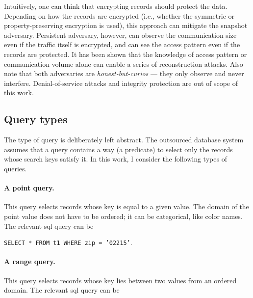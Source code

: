 			Intuitively, one can think that encrypting records should protect the data.
			Depending on how the records are encrypted (i.e., whether the symmetric or property-preserving encryption is used), this approach can mitigate the snapshot adversary.
			Persistent adversary, however, can observe the communication size even if the traffic itself is encrypted, and can see the access pattern even if the records are protected.
			It has been shown that the knowledge of access pattern \cite{multidimensional-range-queries, inference-attack-islam-14, leakage-abuse-attacks-cash-15, inference-attacks-naveed-15, generic-attacks-kellaris, attacks-tao-of-inference, grubbs-attacks, access-pattern-disclosure, attacks-improved-reconstruction} or communication volume \cite{generic-attacks-kellaris, state-of-uniform, attacks-improved-reconstruction, pump-volume-attacks, volume-range-attacks} alone can enable a series of reconstruction attacks.
			Also note that both adversaries are \emph{honest-but-curios} --- they only observe and never interfere.
			Denial-of-service attacks and integrity protection are out of scope of this work.

		\subsection{Query types}

			The type of query \query{} is deliberately left abstract.
			The outsourced database system assumes that a query contains a way (a predicate) to select only the records whose search keys satisfy it.
			In this work, I consider the following types of queries.

			\paragraph*{A point query.}
				This query selects records whose key is equal to a given value.
				The domain of the point value does not have to be ordered; it can be categorical, like color names.
				The relevant \acrshort{sql} query can be

				\texttt{SELECT * FROM t1 WHERE zip = '02215'}.

			\paragraph*{A range query.}
				This query selects records whose key lies between two values from an ordered domain.
				The relevant \acrshort{sql} query can be

